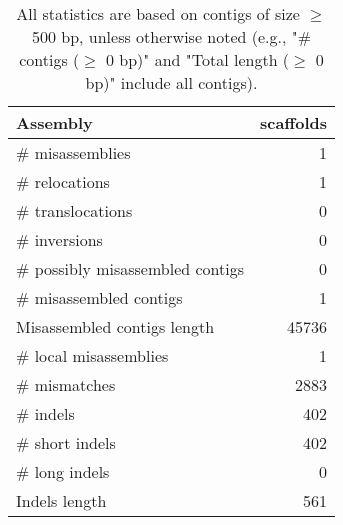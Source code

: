 \documentclass[12pt,a4paper]{article}
\begin{document}
\begin{table}[ht]
\begin{center}
\caption{All statistics are based on contigs of size $\geq$ 500 bp, unless otherwise noted (e.g., "\# contigs ($\geq$ 0 bp)" and "Total length ($\geq$ 0 bp)" include all contigs).}
\begin{tabular}{|l*{1}{|r}|}
\hline
Assembly & scaffolds \\ \hline
\# misassemblies & 1 \\ \hline
\hspace{5mm}\# relocations & 1 \\ \hline
\hspace{5mm}\# translocations & 0 \\ \hline
\hspace{5mm}\# inversions & 0 \\ \hline
\# possibly misassembled contigs & 0 \\ \hline
\# misassembled contigs & 1 \\ \hline
Misassembled contigs length & 45736 \\ \hline
\# local misassemblies & 1 \\ \hline
\# mismatches & 2883 \\ \hline
\# indels & 402 \\ \hline
\hspace{5mm}\# short indels & 402 \\ \hline
\hspace{5mm}\# long indels & 0 \\ \hline
Indels length & 561 \\ \hline
\end{tabular}
\end{center}
\end{table}
\end{document}
